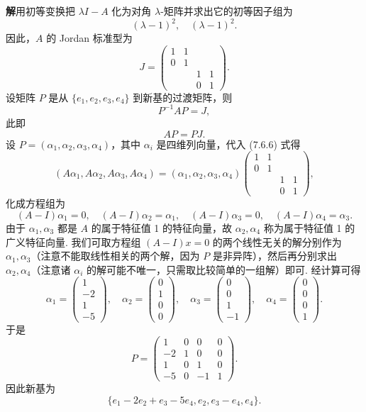 \documentclass[UTF8, 12pt, fontset=fandol, oneside]{ctexart}
\begin{document}
\noindent\textbf{解}\quad 用初等变换把 $\lambda I-A$ 化为对角 $\lambda$-矩阵并求出它的初等因子组为
\[
(\lambda-1)^2,\quad(\lambda-1)^2.
\]
因此，$A$ 的 Jordan 标准型为
\[
J=\left(\begin{array}{cccc}
1 & 1 & & \\
0 & 1 & & \\
& & 1 & 1\\
& & 0 & 1
\end{array}\right).
\]
设矩阵 $P$ 是从 $\{e_1,e_2,e_3,e_4\}$ 到新基的过渡矩阵，则
\[
P^{-1}AP=J,
\]
此即
\begin{equation}
AP=PJ.
\tag{7.6.6}
\end{equation}
设 $P=(\alpha_1,\alpha_2,\alpha_3,\alpha_4)$，其中 $\alpha_i$ 是四维列向量，代入 (7.6.6) 式得
\[
(A\alpha_1,A\alpha_2,A\alpha_3,A\alpha_4)
=(\alpha_1,\alpha_2,\alpha_3,\alpha_4)
\left(\begin{array}{cccc}
1 & 1 & & \\
0 & 1 & & \\
& & 1 & 1\\
& & 0 & 1
\end{array}\right),
\]
化成方程组为
\[
(A-I)\alpha_1=0,\quad
(A-I)\alpha_2=\alpha_1,\quad
(A-I)\alpha_3=0,\quad
(A-I)\alpha_4=\alpha_3.
\]
由于 $\alpha_1,\alpha_3$ 都是 $A$ 的属于特征值 1 的特征向量，故 $\alpha_2,\alpha_4$ 称为属于特征值 1 的广义特征向量. 我们可取方程组 $(A-I)x=0$ 的两个线性无关的解分别作为 $\alpha_1,\alpha_3$（注意不能取线性相关的两个解，因为 $P$ 是非异阵），然后再分别求出 $\alpha_2,\alpha_4$（注意诸 $\alpha_i$ 的解可能不唯一，只需取比较简单的一组解）即可. 经计算可得
\[
\alpha_1=\left(\begin{array}{c}
1\\
-2\\
1\\
-5
\end{array}\right),\quad
\alpha_2=\left(\begin{array}{c}
0\\
1\\
0\\
0
\end{array}\right),\quad
\alpha_3=\left(\begin{array}{c}
0\\
0\\
1\\
-1
\end{array}\right),\quad
\alpha_4=\left(\begin{array}{c}
0\\
0\\
0\\
1
\end{array}\right).
\]
于是
\[
P=\left(\begin{array}{cccc}
1 & 0 & 0 & 0\\
-2 & 1 & 0 & 0\\
1 & 0 & 1 & 0\\
-5 & 0 & -1 & 1
\end{array}\right).
\]
因此新基为
\[
\{e_1-2e_2+e_3-5e_4,e_2,e_3-e_4,e_4\}.
\]
\end{document}
